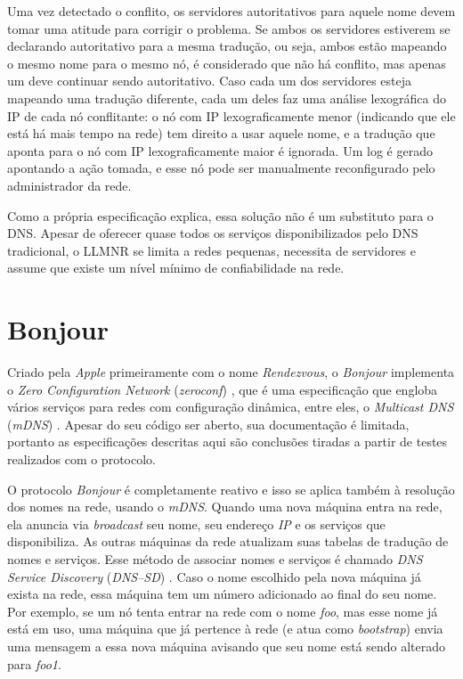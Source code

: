     Uma vez detectado o conflito, os servidores autoritativos para aquele nome
    devem tomar uma atitude para corrigir o problema. Se ambos os servidores
    estiverem se declarando autoritativo para a mesma tradução, ou seja, ambos
    estão mapeando o mesmo nome para o mesmo nó, é considerado que não há conflito,
    mas apenas um deve continuar sendo autoritativo. Caso cada um dos servidores
    esteja mapeando uma tradução diferente, cada um deles faz uma análise lexográfica
    do IP de cada nó conflitante: o nó com IP lexograficamente menor (indicando
    que ele está há mais tempo na rede) tem direito a usar aquele nome, e a
    tradução que aponta para o nó com IP lexograficamente maior é ignorada. Um log
    é gerado apontando a ação tomada, e esse nó pode ser manualmente reconfigurado
    pelo administrador da rede.
    
    Como a própria especificação explica, essa solução não é um substituto para
    o DNS. Apesar de oferecer quase todos os serviços disponibilizados pelo DNS
    tradicional, o LLMNR se limita a redes pequenas, necessita de servidores e
    assume que existe um nível mínimo de confiabilidade na rede.

\section{Bonjour}
\label{Bonjour}

    Criado pela \textit{Apple} primeiramente com o nome \textit{Rendezvous}, o 
    \textit{Bonjour} implementa o \textit{Zero Configuration Network} 
    (\textit{zeroconf}) \cite{zeroconf}, que é uma especificação que engloba vários
    serviços para redes com configuração dinâmica, entre eles, o 
    \textit{Multicast DNS} (\textit{mDNS}) \cite{mdns}. Apesar do seu código ser 
    aberto, sua documentação é limitada, portanto as especificações descritas aqui
    são conclusões tiradas a partir de testes realizados com o protocolo.  

\label{MDNS}
 
    O protocolo \textit{Bonjour} é completamente reativo e isso se aplica também
    à resolução dos nomes na rede, usando o \textit{mDNS}. Quando uma nova máquina
    entra na rede, ela anuncia via \textit{broadcast} seu nome, seu endereço 
    \emph{IP} e os serviços que disponibiliza. As outras máquinas da rede 
    atualizam suas tabelas de tradução de nomes e serviços. Esse método de 
    associar nomes e serviços é chamado \textit{DNS Service Discovery} 
    (\textit{DNS--SD}) \cite{dnssd}. Caso o nome escolhido pela nova máquina 
    já exista na rede, essa máquina tem um número adicionado ao final do seu 
    nome. Por exemplo, se um nó tenta entrar na rede com o nome \emph{foo}, mas
    esse nome já está em uso, uma máquina que já pertence à rede (e atua como
    \textit{bootstrap}) envia uma mensagem a essa nova máquina avisando que seu
    nome está sendo alterado para \emph{foo1}.

